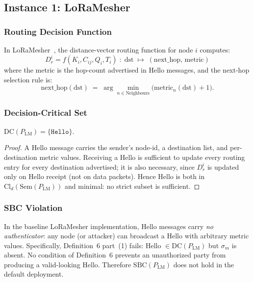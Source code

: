 \subsection{Instance 1: LoRaMesher}
\label{sec:instances-lm}

\subsubsection*{Routing Decision Function}

In LoRaMesher~\cite{loramesher2023}, the distance-vector routing function for
node $i$ computes:
\[
  D_{r}^{i} = f(K_{i}, C_{ij}, Q_{i}, T_{i})
  \;:\;
  \mathrm{dst} \;\mapsto\; (\mathrm{next\_hop},\, \mathrm{metric})
\]
where the metric is the hop-count advertised in Hello messages, and the
next-hop selection rule is:
\[
  \mathrm{next\_hop}(\mathrm{dst}) \;=\;
  \arg\min_{n \in \mathrm{Neighbours}} \bigl(\mathrm{metric}_{n}(\mathrm{dst}) + 1\bigr).
\]

\subsubsection*{Decision-Critical Set}

\begin{proposition}
$\mathrm{DC}(P_{\mathrm{LM}}) = \{\texttt{Hello}\}$.
\end{proposition}

\begin{proof}
A Hello message carries the sender's node-id, a destination list, and
per-destination metric values.
Receiving a Hello is sufficient to update every routing entry for every
destination advertised; it is also necessary, since $D_{r}^{i}$ is updated only
on Hello receipt (not on data packets).
Hence Hello is both in $\mathrm{Cl}_{d}(\mathrm{Sem}(P_{\mathrm{LM}}))$ and
minimal: no strict subset is sufficient.
\end{proof}

\subsubsection*{SBC Violation}

In the baseline LoRaMesher implementation, Hello messages carry \emph{no
authenticator}: any node (or attacker) can broadcast a Hello with arbitrary
metric values.
Specifically, Definition~6 part~(1) fails: Hello $\in \mathrm{DC}(P_{\mathrm{LM}})$
but $\sigma_{m}$ is absent.
No condition of Definition~6 prevents an unauthorized party from producing a
valid-looking Hello.
Therefore $\mathrm{SBC}(P_{\mathrm{LM}})$ does not hold in the default deployment.

